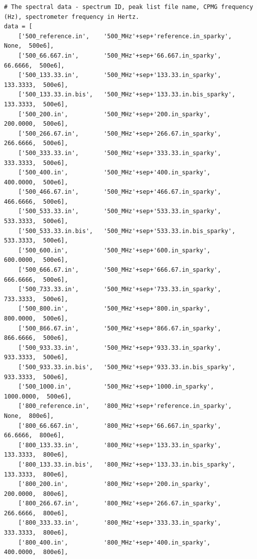 \begin{lstlisting}[firstnumber=45]
# The spectral data - spectrum ID, peak list file name, CPMG frequency (Hz), spectrometer frequency in Hertz.
data = [
    ['500_reference.in',    '500_MHz'+sep+'reference.in_sparky',           None,  500e6],
    ['500_66.667.in',       '500_MHz'+sep+'66.667.in_sparky',           66.6666,  500e6],
    ['500_133.33.in',       '500_MHz'+sep+'133.33.in_sparky',          133.3333,  500e6],
    ['500_133.33.in.bis',   '500_MHz'+sep+'133.33.in.bis_sparky',      133.3333,  500e6],
    ['500_200.in',          '500_MHz'+sep+'200.in_sparky',             200.0000,  500e6],
    ['500_266.67.in',       '500_MHz'+sep+'266.67.in_sparky',          266.6666,  500e6],
    ['500_333.33.in',       '500_MHz'+sep+'333.33.in_sparky',          333.3333,  500e6],
    ['500_400.in',          '500_MHz'+sep+'400.in_sparky',             400.0000,  500e6],
    ['500_466.67.in',       '500_MHz'+sep+'466.67.in_sparky',          466.6666,  500e6],
    ['500_533.33.in',       '500_MHz'+sep+'533.33.in_sparky',          533.3333,  500e6],
    ['500_533.33.in.bis',   '500_MHz'+sep+'533.33.in.bis_sparky',      533.3333,  500e6],
    ['500_600.in',          '500_MHz'+sep+'600.in_sparky',             600.0000,  500e6],
    ['500_666.67.in',       '500_MHz'+sep+'666.67.in_sparky',          666.6666,  500e6],
    ['500_733.33.in',       '500_MHz'+sep+'733.33.in_sparky',          733.3333,  500e6],
    ['500_800.in',          '500_MHz'+sep+'800.in_sparky',             800.0000,  500e6],
    ['500_866.67.in',       '500_MHz'+sep+'866.67.in_sparky',          866.6666,  500e6],
    ['500_933.33.in',       '500_MHz'+sep+'933.33.in_sparky',          933.3333,  500e6],
    ['500_933.33.in.bis',   '500_MHz'+sep+'933.33.in.bis_sparky',      933.3333,  500e6],
    ['500_1000.in',         '500_MHz'+sep+'1000.in_sparky',           1000.0000,  500e6],
    ['800_reference.in',    '800_MHz'+sep+'reference.in_sparky',           None,  800e6],
    ['800_66.667.in',       '800_MHz'+sep+'66.667.in_sparky',           66.6666,  800e6],
    ['800_133.33.in',       '800_MHz'+sep+'133.33.in_sparky',          133.3333,  800e6],
    ['800_133.33.in.bis',   '800_MHz'+sep+'133.33.in.bis_sparky',      133.3333,  800e6],
    ['800_200.in',          '800_MHz'+sep+'200.in_sparky',             200.0000,  800e6],
    ['800_266.67.in',       '800_MHz'+sep+'266.67.in_sparky',          266.6666,  800e6],
    ['800_333.33.in',       '800_MHz'+sep+'333.33.in_sparky',          333.3333,  800e6],
    ['800_400.in',          '800_MHz'+sep+'400.in_sparky',             400.0000,  800e6],

\end{lstlisting}
